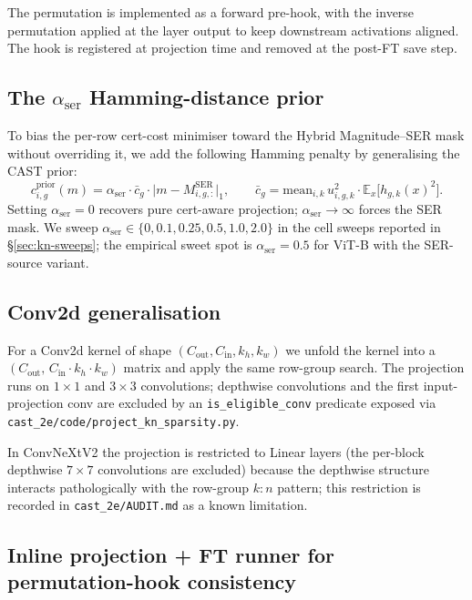 \documentclass[11pt]{article}
\theoremstyle{plain}
\theoremstyle{definition}
\theoremstyle{remark}
\newcommand{\EE}{\mathbb{E}}
\newcommand{\1}{\mathbf{1}}
\begin{document}
The permutation is implemented as a forward pre-hook, with the inverse permutation applied at the layer output to keep downstream activations aligned. The hook is registered at projection time and removed at the post-FT save step.

\subsection{The \texorpdfstring{$\alpha_{\mathrm{ser}}$}{alpha-ser} Hamming-distance prior}
\label{subsec:alpha-ser}

To bias the per-row cert-cost minimiser toward the Hybrid Magnitude--SER mask without overriding it, we add the following Hamming penalty by generalising the CAST prior:
\begin{equation}
\label{eq:alpha-ser}
c^{\mathrm{prior}}_{i,g}(m) = \alpha_{\mathrm{ser}} \cdot \bar{c}_g \cdot \bigl| m - M^{\mathrm{SER}}_{i,g,:} \bigr|_1,
\qquad
\bar{c}_g = \mathrm{mean}_{i,k}\, u_{i,g,k}^2 \cdot \EE_x\bigl[h_{g,k}(x)^2\bigr].
\end{equation}
Setting $\alpha_{\mathrm{ser}}=0$ recovers pure cert-aware projection; $\alpha_{\mathrm{ser}} \to \infty$ forces the SER mask. We sweep $\alpha_{\mathrm{ser}} \in \{0, 0.1, 0.25, 0.5, 1.0, 2.0\}$ in the cell sweeps reported in \S\ref{sec:kn-sweeps}; the empirical sweet spot is $\alpha_{\mathrm{ser}} = 0.5$ for ViT-B with the SER-source variant.

\subsection{Conv2d generalisation}
\label{subsec:conv-pipeline}

For a Conv2d kernel of shape $(C_{\mathrm{out}}, C_{\mathrm{in}}, k_h, k_w)$ we unfold the kernel into a $(C_{\mathrm{out}},\, C_{\mathrm{in}} \cdot k_h \cdot k_w)$ matrix and apply the same row-group search. The projection runs on $1{\times}1$ and $3{\times}3$ convolutions; depthwise convolutions and the first input-projection conv are excluded by an \texttt{is\_eligible\_conv} predicate exposed via \texttt{cast\_2e/code/project\_kn\_sparsity.py}.

In ConvNeXtV2 the projection is restricted to Linear layers (the per-block depthwise $7{\times}7$ convolutions are excluded) because the depthwise structure interacts pathologically with the row-group $k{:}n$ pattern; this restriction is recorded in \texttt{cast\_2e/AUDIT.md} as a known limitation.

\subsection{Inline projection + FT runner for permutation-hook consistency}
\label{subsec:inline-ft}
\end{document}
